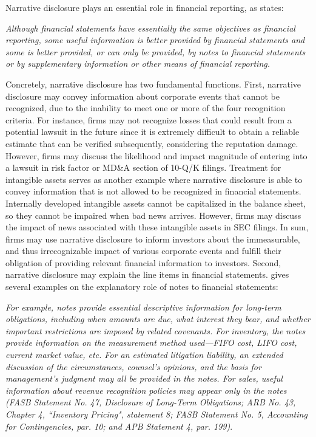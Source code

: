 \documentclass[a4paper]{article}
\begin{document}
\begin{spacing}{2}
Narrative disclosure plays an essential role in financial reporting, as \citet*[par. 7]{fasbStatementFinancialAccounting1984} states:

\textit{Although financial statements have essentially the same objectives as financial reporting, some useful information is better provided by financial statements and some is better provided, or can only be provided, by notes to financial statements or by supplementary information or other means of financial reporting.}

Concretely, narrative disclosure has two fundamental functions. First, narrative disclosure may convey information about corporate events that cannot be recognized, due to the inability to meet one or more of the four recognition criteria. For instance, firms may not recognize losses that could result from a potential lawsuit in the future since it is extremely difficult to obtain a reliable estimate that can be verified subsequently, considering the reputation damage. However, firms may discuss the likelihood and impact magnitude of entering into a lawsuit in risk factor or MD\&A section of 10-Q/K filings. Treatment for intangible assets serves as another example where narrative disclosure is able to convey information that is not allowed to be recognized in financial statements. Internally developed intangible assets cannot be capitalized in the balance sheet, so they cannot be impaired when bad news arrives. However, firms may discuss the impact of news associated with these intangible assets in SEC filings. In sum, firms may use narrative disclosure to inform investors about the immeasurable, and thus irrecognizable impact of various corporate events and fulfill their obligation of providing relevant financial information to investors. Second, narrative disclosure may explain the line items in financial statements. \citet*[footnote 4]{fasbStatementFinancialAccounting1984} gives several examples on the explanatory role of notes to financial statements:

\textit{For example, notes provide essential descriptive information for long-term obligations, including when amounts are due, what interest they bear, and whether important restrictions are imposed by related covenants. For inventory, the notes provide information on the measurement method used---FIFO cost, LIFO cost, current market value, etc. For an estimated litigation liability, an extended discussion of the circumstances, counsel's opinions, and the basis for management's judgment may all be provided in the notes. For sales, useful information about revenue recognition policies may appear only in the notes (FASB Statement No. 47, Disclosure of Long-Term Obligations; ARB No. 43, Chapter 4, ``Inventory Pricing", statement 8; FASB Statement No. 5, Accounting for Contingencies, par. 10; and APB Statement 4, par. 199)}.


\end{spacing}
\end{document}

